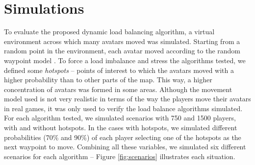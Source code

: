 \documentclass[acmjacm]{acmtrans2m}
\begin{document}
\section{Simulations}
\label{sec:simul}

To evaluate the proposed dynamic load balancing algorithm, a virtual environment across which many avatars moved was simulated. Starting from a random point in the environment, each avatar moved according to the random waypoint model \cite{bettstetter2004spr}. To force a load imbalance and stress the algorithms tested, we defined some \emph{hotspots} -- points of interest to which the avatars moved with a higher probability than to other parts of the map. This way, a higher concentration of avatars was formed in some areas. Although the movement model used is not very realistic in terms of the way the players move their avatars in real games, it was only used to verify the load balance algorithms simulated. For each algorithm tested, we simulated scenarios with 750 and 1500 players, with and without hotspots. In the cases with hotspots, we simulated different probabilities (70\% and 90\%) of each player selecting one of the hotspots as the next waypoint to move. Combining all these variables, we simulated six different scenarios for each algorithm -- Figure \ref{fig:scenarios} illustrates each situation.
\end{document}
